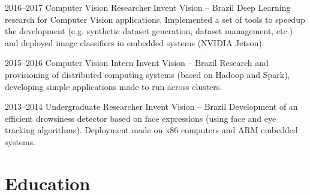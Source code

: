 \documentclass[a4paper]{cv-friggeri-x}
\begin{document}
\begin{entrylist}
\entry
    {2016--2017}
    {Computer Vision Researcher}%
    {Invent Vision -- Brazil}
    {Deep Learning research for Computer Vision applications. Implemented a set of tools to speedup the development (e.g. synthetic dataset generation, dataset management, etc.) and deployed image classifiers in embedded systems (NVIDIA Jetson).}

\entry
    {2015--2016}
    {Computer Vision Intern}
    {Invent Vision -- Brazil}
    {Research and provisioning of distributed computing systems (based on Hadoop and Spark), developing simple applications made to run across clusters.}

\entry
    {2013--2014}
    {Undergraduate Researcher}
    {Invent Vision -- Brazil}
    {Development of an efficient drowsiness detector based on face expressions (using face and eye tracking algorithms). Deployment made on x86 computers and ARM embedded systems.}



\end{entrylist}




\section{Education}
\end{document}
